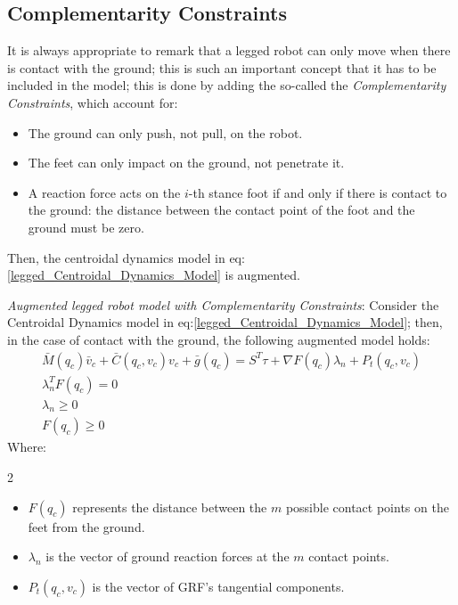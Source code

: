 \subsection{Complementarity Constraints}
It is always appropriate to remark that a legged robot can only move when there is contact with the ground; this is such an important concept that it has to be included in the model; this is done by adding the so-called the \textit{Complementarity Constraints}, which account for:
\begin{itemize}
    \item The ground can only push, not pull, on the robot.
    \item The feet can only impact on the ground, not penetrate it.
    \item A reaction force acts on the $i$-th stance foot if and only if there is contact to the ground: the distance between the contact point of the foot and the ground must be zero.
\end{itemize}
Then, the centroidal dynamics model in eq:\ref{legged_Centroidal_Dynamics_Model} is augmented.
\begin{definition}\label{legged_robot_compl_const_model}
    \textit{Augmented legged robot model with Complementarity Constraints}: Consider the Centroidal Dynamics model in eq:\ref{legged_Centroidal_Dynamics_Model}; then, in the case of contact with the ground, the following augmented model holds:
    \begin{gather}\label{legged_robot_compl_const_model_eq}
        \bar{M}(q_c)\bar{v}_c+\bar{C}(q_c,v_c)v_c+\bar{g}(q_c)=S^{T}\tau+\nabla F(q_c)\lambda_n+P_t(q_c,v_c)\\
        \lambda^{T}_nF(q_c)=0\\
        \lambda_n\geq0\\
        F(q_c)\geq0
    \end{gather}
    Where:
    \begin{multicols}{2}
        \begin{itemize}
            \item $F(q_c)$ represents the distance between the $m$ possible contact points on the feet from the ground.
            \item $\lambda_n$ is the vector of ground reaction forces at the $m$ contact points.
            \item $P_t(q_c,v_c)$ is the vector of GRF's tangential components.
        \end{itemize}
    \end{multicols}
\end{definition}

